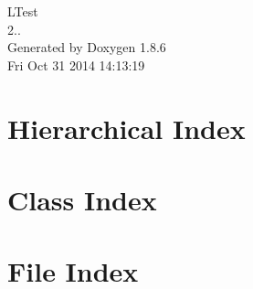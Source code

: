 \documentclass[twoside]{book}
\newcommand{\clearemptydoublepage}{%
  \newpage{\pagestyle{empty}\cleardoublepage}%
}
\begin{document}
\hypersetup{pageanchor=false}
\begin{titlepage}
\vspace*{7cm}
\begin{center}%
{\Large L\-Test \\[1ex]\large 2.. }\\
\vspace*{1cm}
{\large Generated by Doxygen 1.8.6}\\
\vspace*{0.5cm}
{\small Fri Oct 31 2014 14:13:19}\\
\end{center}
\end{titlepage}
\clearemptydoublepage
\tableofcontents
\clearemptydoublepage
{}
\hypersetup{pageanchor=true}

\chapter{Hierarchical Index}

\chapter{Class Index}

\chapter{File Index}

\end{document}
